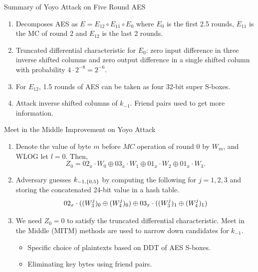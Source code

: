 \documentclass[notheorems]{beamer}
\theoremstyle{definition}
\theoremstyle{example}
\begin{document}
    \begin{frame}[<+->]{Summary of Yoyo Attack on Five Round AES}
        \begin{enumerate}
            \item Decomposes AES as \(E = E_{12} \circ E_{11} \circ E_0\) where
            \(E_0\) is the first 2.5 rounds, \(E_{11}\) is the MC of round 2 and
            \(E_{12}\) is the last 2 rounds.
            \item Truncated differential characteristic for \(E_0\): zero input
            difference in three inverse shifted columns and zero output
            difference in a single shifted column with probability \(4 \cdot
            2^{-8} = 2^{-6}\).
            \item For \(E_{12}\), 1.5 rounds of AES can be taken as four 32-bit
            super S-boxes.
            \item Attack inverse shifted columns of \(k_{-1}\). Friend pairs
            used to get more information.
        \end{enumerate}
    \end{frame}

    \begin{frame}[<+->]{Meet in the Middle Improvement on Yoyo Attack}
        \begin{enumerate}
            \item Denote the value of byte \(m\) before \(MC\) operation of
            round 0 by \(W_m\), and WLOG let \(l = 0\). Then,
            \begin{equation}
                Z_0 = 02_x \cdot W_0 \oplus 03_x \cdot W_1 \oplus 01_x \cdot W_2 \oplus 01_x \cdot W_3.
                \label{eq:mitm}
            \end{equation}
            \item Adversary guesses \(k_{-1, \{0, 5\}}\) by computing the
            following for \(j = 1, 2, 3\) and storing the concatenated 24-bit
            value in a hash table.
            \begin{equation}
                02_x \cdot ((W_3^j)_0 \oplus (W_4^j)_0) \oplus 03_x \cdot ((W_3^j)_1 \oplus (W_4^j)_1)
                \label{eq:mitm-0-5}
            \end{equation}
            \item We need \(Z_0 = 0\) to satisfy the truncated differential
            characteristic. Meet in the Middle (MITM) methods are used to narrow
            down candidates for \(k_{-1}\).
            \begin{itemize}
                \item Specific choice of plaintexts based on DDT of AES S-boxes.
                \item Eliminating key bytes using friend pairs.
            \end{itemize}
        \end{enumerate} 
    \end{frame}
\end{document}
